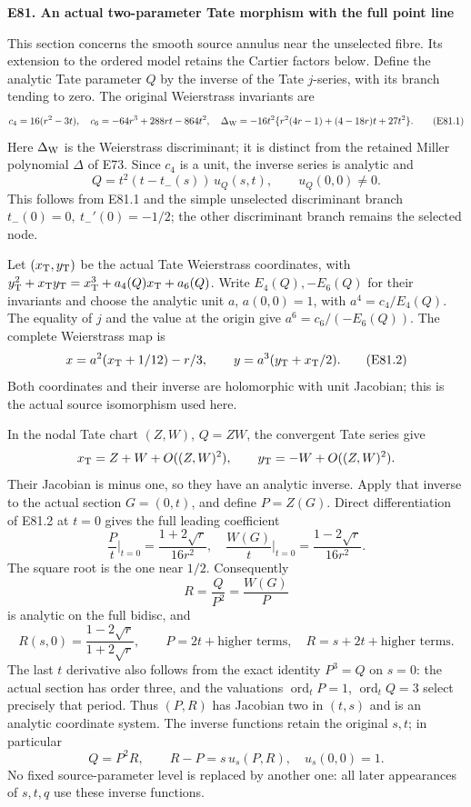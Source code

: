 \par

\medskip\noindent\textbf{E81. An actual two-parameter Tate morphism with the full point line}

\par\nobreak

This section concerns the smooth source annulus near the unselected
fibre. Its extension to the ordered model retains the Cartier
factors below. Define the analytic Tate parameter \(Q\) by the
inverse of the Tate \(j\)-series, with its branch tending to zero.
The original Weierstrass invariants are
\[
 c_4=16(r^2-3t),\quad
 c_6=-64r^3+288rt-864t^2,\quad
 \Delta_{\rm W}=-16t^2
       \{r^2(4r-1)+(4-18r)t+27t^2\}.             \tag{E81.1}
\]
Here \(\Delta_{\rm W}\) is the Weierstrass discriminant;
it is distinct from the retained Miller polynomial \(\Delta\)
of E73. Since \(c_4\) is a unit, the inverse series is analytic
and
\[
 Q=t^2(t-t_-(s))\,u_Q(s,t),\qquad u_Q(0,0)\ne0.
\]
This follows from E81.1 and the simple unselected discriminant
branch \(t_-(0)=0,\ t_-'(0)=-1/2\); the other discriminant
branch remains the selected node.

Let \((x_{\rm T},y_{\rm T})\) be the actual Tate Weierstrass
coordinates, with
\(y_{\rm T}^2+x_{\rm T}y_{\rm T}
 =x_{\rm T}^3+a_4(Q)x_{\rm T}+a_6(Q)\).
Write \(E_4(Q),-E_6(Q)\) for their invariants and choose
the analytic unit \(a\), \(a(0,0)=1\), with
\(a^4=c_4/E_4(Q)\). The equality of \(j\) and the value
at the origin give \(a^6=c_6/(-E_6(Q))\).
The complete Weierstrass map is
\[
 x=a^2(x_{\rm T}+1/12)-r/3,\qquad
 y=a^3(y_{\rm T}+x_{\rm T}/2).                  \tag{E81.2}
\]
Both coordinates and their inverse are holomorphic with unit
Jacobian; this is the actual source isomorphism used here.

In the nodal Tate chart \((Z,W)\), \(Q=ZW\), the convergent
Tate series give
\[
 x_{\rm T}=Z+W+O((Z,W)^2),\qquad
 y_{\rm T}=-W+O((Z,W)^2).
\]
Their Jacobian is minus one, so they have an analytic inverse.
Apply that inverse to the actual section \(G=(0,t)\), and
define \(P=Z(G)\). Direct differentiation of E81.2 at \(t=0\)
gives the full leading coefficient
\[
 \frac Pt\bigg|_{t=0}
       =\frac{1+2\sqrt r}{16r^2},
 \quad
 \frac{W(G)}t\bigg|_{t=0}
       =\frac{1-2\sqrt r}{16r^2}.               \tag{E81.3}
\]
The square root is the one near \(1/2\). Consequently
\[
 R=\frac{Q}{P^2}=\frac{W(G)}P
\]
is analytic on the full bidisc, and
\[
 R(s,0)=\frac{1-2\sqrt r}{1+2\sqrt r},\qquad
 P=2t+\text{higher terms},\quad
 R=s+2t+\text{higher terms}.                    \tag{E81.4}
\]
The last \(t\) derivative also follows from the exact identity
\(P^3=Q\) on \(s=0\): the actual section has order three,
and the valuations \(\operatorname{ord}_tP=1\),
\(\operatorname{ord}_tQ=3\) select precisely that period.
Thus \((P,R)\) has Jacobian two in \((t,s)\) and is an
analytic coordinate system. The inverse functions retain
the original \(s,t\); in particular
\[
 Q=P^2R,\qquad R-P=s\,u_s(P,R),\quad u_s(0,0)=1.
 \tag{E81.5}
\]
No fixed source-parameter level is replaced by another
one: all later appearances of \(s,t,q\) use these inverse
functions.

